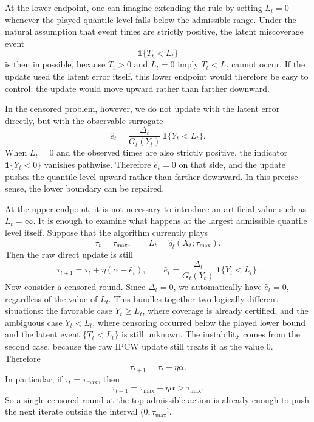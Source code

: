 \documentclass[11pt]{article}
\newcommand{\1}{\mathbf{1}}
\begin{document}
At the lower endpoint, one can imagine extending the rule by setting $L_t=0$ whenever the played quantile level falls below the admissible range. Under the natural assumption that event times are strictly positive, the latent miscoverage event
\[
\1\{T_t< L_t\}
\]
is then impossible, because $T_t>0$ and $L_t=0$ imply $T_t<L_t$ cannot occur. If the update used the latent error itself, this lower endpoint would therefore be easy to control: the update would move upward rather than farther downward.

In the censored problem, however, we do not update with the latent error directly, but with the observable surrogate
\[
\hat e_t
=
\frac{\Delta_t}{G_t(Y_t)}\,\mathbf{1}\{Y_t< L_t\}.
\]
When $L_t=0$ and the observed times are also strictly positive, the indicator $\mathbf{1}\{Y_t<0\}$ vanishes pathwise. Therefore $\hat e_t=0$ on that side, and the update pushes the quantile level upward rather than farther downward. In this precise sense, the lower boundary can be repaired.

At the upper endpoint, it is not necessary to introduce an artificial value such as $L_t=\infty$. It is enough to examine what happens at the largest admissible quantile level itself. Suppose that the algorithm currently plays
\[
\tau_t=\tau_{\max},
\qquad
L_t=\hat q_t(X_t;\tau_{\max}).
\]
Then the raw direct update is still
\[
\tau_{t+1}=\tau_t+\eta(\alpha-\hat e_t),
\qquad
\hat e_t
=
\frac{\Delta_t}{G_t(Y_t)}\,\mathbf{1}\{Y_t< L_t\}.
\]
Now consider a censored round. Since $\Delta_t=0$, we automatically have $\hat e_t=0$, regardless of the value of $L_t$. This bundles together two logically different situations: the favorable case $Y_t\ge L_t$, where coverage is already certified, and the ambiguous case $Y_t<L_t$, where censoring occurred below the played lower bound and the latent event $\{T_t<L_t\}$ is still unknown. The instability comes from the second case, because the raw IPCW update still treats it as the value $0$. Therefore
\[
\tau_{t+1}=\tau_t+\eta\alpha.
\]
In particular, if $\tau_t=\tau_{\max}$, then
\[
\tau_{t+1}=\tau_{\max}+\eta\alpha>\tau_{\max}.
\]
So a single censored round at the top admissible action is already enough to push the next iterate outside the interval $(0,\tau_{\max}]$.
\end{document}
